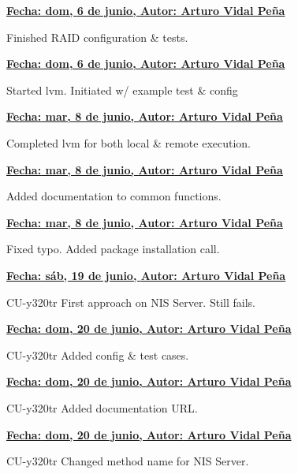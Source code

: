 \item \textbf{\underline{\underline{Fecha:} dom,  6 de junio, \underline{Autor:} Arturo Vidal Peña}}\\\item[] Finished RAID configuration \& tests.\\
\item \textbf{\underline{\underline{Fecha:} dom,  6 de junio, \underline{Autor:} Arturo Vidal Peña}}\\\item[] Started lvm. Initiated w/ example test \& config\\
\item \textbf{\underline{\underline{Fecha:} mar,  8 de junio, \underline{Autor:} Arturo Vidal Peña}}\\\item[] Completed lvm for both local \& remote execution.\\
\item \textbf{\underline{\underline{Fecha:} mar,  8 de junio, \underline{Autor:} Arturo Vidal Peña}}\\\item[] Added documentation to common functions.\\
\item \textbf{\underline{\underline{Fecha:} mar,  8 de junio, \underline{Autor:} Arturo Vidal Peña}}\\\item[] Fixed typo. Added package installation call.\\
\item \textbf{\underline{\underline{Fecha:} sáb, 19 de junio, \underline{Autor:} Arturo Vidal Peña}}\\\item[] CU-y320tr First approach on NIS Server. Still fails.\\
\item \textbf{\underline{\underline{Fecha:} dom, 20 de junio, \underline{Autor:} Arturo Vidal Peña}}\\\item[] CU-y320tr Added config \& test cases.\\
\item \textbf{\underline{\underline{Fecha:} dom, 20 de junio, \underline{Autor:} Arturo Vidal Peña}}\\\item[] CU-y320tr Added documentation URL.\\
\item \textbf{\underline{\underline{Fecha:} dom, 20 de junio, \underline{Autor:} Arturo Vidal Peña}}\\\item[] CU-y320tr Changed method name for NIS Server.\\
